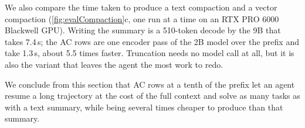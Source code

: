 We also compare the time taken to produce a text compaction and a vector compaction (\cref{fig:evalCompaction}c,
one run at a time on an RTX PRO 6000 Blackwell GPU). Writing the summary is a 510-token decode by the 9B that takes
7.4\,s; the AC rows are one encoder pass of the 2B model over the prefix and take 1.3\,s, about 5.5 times faster.
Truncation needs no model call at all, but it is also the variant that leaves the agent the most work to redo.

We conclude from this section that AC rows at a tenth of the prefix let an agent resume a long trajectory at the cost of
the full context and solve as many tasks as with a text summary, while being several times cheaper to produce than that
summary.
